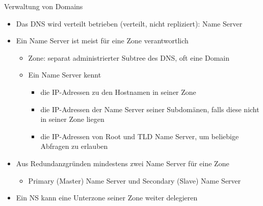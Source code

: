 \begin{concept}{Verwaltung von Domains}
    \begin{itemize}
        \item Das DNS wird verteilt betrieben (verteilt, nicht repliziert): Name Server
        \item Ein Name Server ist meist für eine Zone verantwortlich
        \begin{itemize}
            \item Zone: separat administrierter Subtree des DNS, oft eine Domain
            \item Ein Name Server kennt
            \begin{itemize}
                \item die IP-Adressen zu den Hostnamen in seiner Zone
                \item die IP-Adressen der Name Server seiner Subdomänen, falls diese nicht in seiner Zone liegen
                \item die IP-Adressen von Root und TLD Name Server, um beliebige Abfragen zu erlauben
            \end{itemize}
        \end{itemize}
        \item Aus Redundanzgründen mindestens zwei Name Server für eine Zone
        \begin{itemize}
            \item Primary (Master) Name Server und Secondary (Slave) Name Server
        \end{itemize}
        \item Ein NS kann eine Unterzone seiner Zone weiter delegieren
    \end{itemize}
\end{concept}

